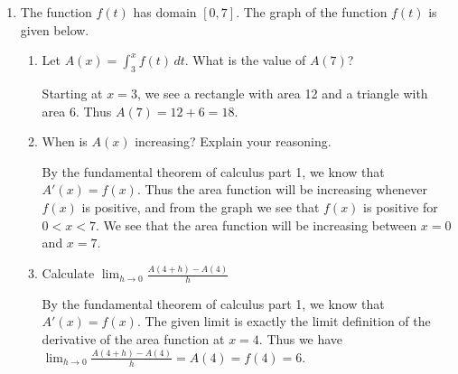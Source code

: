 \documentclass{article}
\begin{document}
\begin{enumerate}

\item The function $f(t)$ has domain $[0,7]$. The graph of the function $f(t)$ is given below. 
\begin{center} 
\end{center} 
    
\begin{enumerate} 
\item Let $A(x)=\displaystyle\int_3^x f(t)\,dt$. What is the value of $A(7)$?
\probonly{\vspace{0.25in}}

\begin{solution}
Starting at $x=3$, we see a rectangle with area 12 and a triangle with area 6. Thus $A(7)=12+6=18$.
\end{solution}

\item When is $A(x)$ increasing? Explain your reasoning.
\probonly{\vspace{1 in}}

\begin{solution}
By the fundamental theorem of calculus part 1, we know that $A'(x)=f(x)$. Thus the area function will be increasing whenever $f(x)$ is positive, and from the graph we see that $f(x)$ is positive for $0< x< 7$. We see that the area function will be increasing between $x=0$ and $x=7$.
\end{solution}


\item Calculate $\displaystyle \lim_{h \rightarrow 0} \frac{A(4+h)- A(4)}{h}$
\probonly{\vspace{0.5in}}

\begin{solution}
By the fundamental theorem of calculus part 1, we know that $A'(x)=f(x)$. The given limit is exactly the limit definition of the derivative of the area function at $x=4$. Thus we have $\displaystyle \lim_{h \rightarrow 0} \frac{A(4+h)- A(4)}{h} = A(4)=f(4)=6$.
\end{solution}


\end{enumerate}
\end{enumerate}
\end{document}
